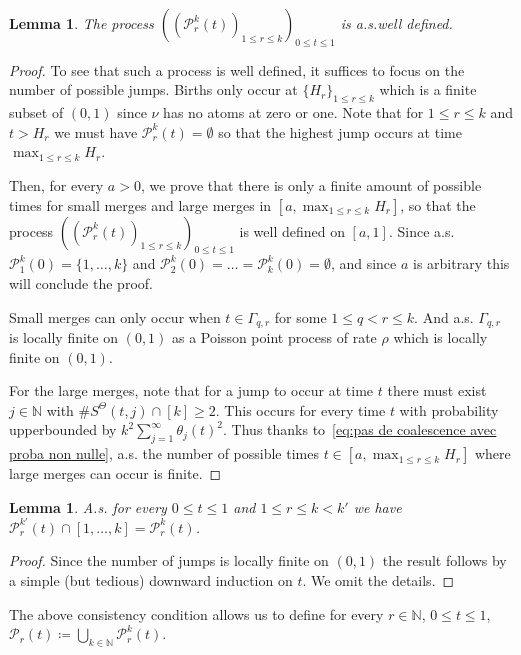 \documentclass[10pt]{amsart}
\newtheorem{lemm}[theo]{Lemma}\newtheorem{prop}[theo]{Proposition}\newtheorem{coro}[theo]{Corollary}\newtheorem{conj}[theo]{Conjecture}
\theoremstyle{definition}\newtheorem{defi}[theo]{Definition}\newtheorem{rema}[theo]{Remark}\newtheorem{exam}[theo]{Example}\newtheorem{exem}[theo]{Example}\newtheorem{nota}[theo]{Notation}
\newcommand{\N}{\mathbb{N}}
\newcommand{\1}{\mathbbm{1}}
\newcommand{\Part}{\mathcal{P}}
\begin{document}
\begin{lemm}\label{lemme coalescent continu bien defini}
The process $((\Part_r^k(t))_{1\leq r \leq k})_{0\leq t\leq 1}$ is a.s.\@ well defined.
\end{lemm}

\begin{proof}
To see that such a process is well defined, it suffices to focus on the number of possible jumps. Births only occur at $\{H_r\}_{1\leq r \leq k}$ which is a finite subset of $(0,1)$ since $\nu$ has no atoms at zero or one. Note that for $1\leq r \leq k$ and $t>H_r$ we must have $\Part_r^k(t)=\emptyset$ so that the highest jump occurs at time $\max_{1\leq r \leq k} H_r$.

Then, for every $a>0$, we prove that there is only a finite amount of possible times for small merges and large merges in $[a, \max_{1 \le r \le k} H_r]$, so that the process $((\Part_r^k(t))_{1\leq r \leq k})_{0\leq t\leq 1}$ is well defined on $[a, 1]$. Since a.s. $\Part^k_1(0)=\{1,\dots, k\}$ and $\Part_2^k(0)=\dots=\Part_k^k(0)=\emptyset$, and since $a$ is arbitrary this will conclude the proof.

Small merges can only occur when $t\in \Gamma_{q,r}$ for some $1\leq q<r\leq k$. And a.s. $\Gamma_{q,r}$ is locally finite on $(0,1)$ as a Poisson point process of rate $\rho$ which is locally finite on $(0,1)$.

For the large merges, note {that} for a jump to occur at time $t$ there must exist $j\in \N$ with $\#S^\Theta(t,j)\cap[k]\geq 2$. This occurs for every time $t$ with probability upperbounded by $k^2\sum_{j=1}^\infty \theta_j(t)^2$. Thus thanks to~\eqref{eq:pas de coalescence avec proba non nulle}, a.s. the number of possible times $t \in[a, \max_{1 \le r \le k} H_r]$ where large merges can occur is finite.
\end{proof}

\begin{lemm}
A.s. for every $0\leq t\leq 1$ and $1\leq r \leq k <k'$ we have $\Part_r^{k'}(t)\cap[1,\dots, k]=\Part_r^{k}(t)$.
\end{lemm}

\begin{proof}
Since the number of jumps is locally finite on $(0,1)$ the result follows by a simple (but tedious) downward induction on $t$. We omit the details.
\end{proof}

The above consistency condition allows us to define for every $r\in \N$, $0\leq t \leq 1$, $\Part_r(t)\coloneqq\bigcup_{k\in \N}\Part_r^k(t)$.
\end{document}
